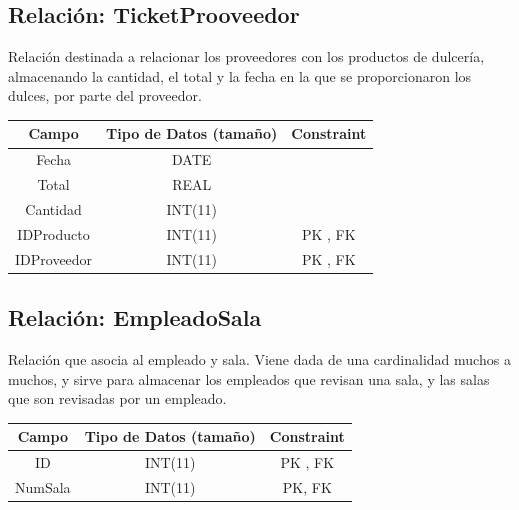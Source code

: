 \documentclass[12pt, fleqn]{report}                             %
\begin{document}
        \clearpage
        \subsection*{Relación: TicketProoveedor}

            Relación destinada a relacionar los proveedores con los productos de dulcería,
            almacenando la cantidad, el total y la fecha en la que se proporcionaron los dulces,
            por parte del proveedor.

            \vspace{2em}

            \small{
            \begin{tabular}{| c | c | c |}
                \hline
                \textbf{Campo} & \textbf{Tipo de Datos (tamaño)} & \textbf{Constraint} \\[0.5ex] 
                \hline\hline
                
                Fecha       & DATE          &                       \\
                Total       & REAL          &                       \\
                Cantidad    & INT(11)       &                       \\
                IDProducto  & INT(11)       & PK , FK               \\
                IDProveedor & INT(11)       & PK , FK               \\
                \hline
            \end{tabular}
            }

        \subsection*{Relación: EmpleadoSala}

            Relación que asocia al empleado y sala. Viene dada de una cardinalidad
            muchos a muchos, y sirve para almacenar los empleados que revisan una sala,
            y las salas que son revisadas por un empleado.

            \vspace{2em}

            \small{
            \begin{tabular}{| c | c | c |}
                \hline
                \textbf{Campo} & \textbf{Tipo de Datos (tamaño)} & \textbf{Constraint} \\[0.5ex] 
                \hline\hline
                
                ID          & INT(11)       & PK , FK               \\
                NumSala     & INT(11)       & PK, FK                \\
                \hline
            \end{tabular}
            }
\end{document}

